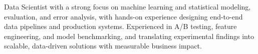 
Data Scientist with a strong focus on machine learning and statistical modeling, evaluation, and error analysis, with hands-on experience designing end-to-end data pipelines and production systems. Experienced in A/B testing, feature engineering, and model benchmarking, and translating experimental findings into scalable, data-driven solutions with measurable business impact.


